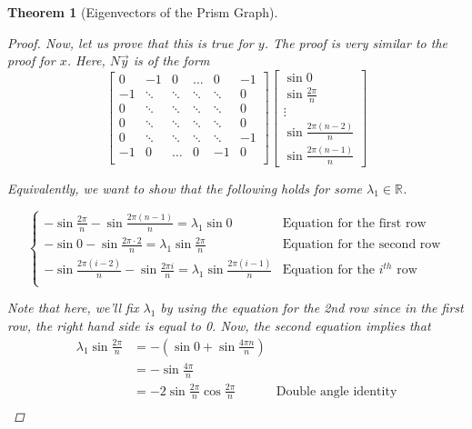 \documentclass[11pt]{report}
\newtheorem{theorem}{Theorem}[section]
\begin{document}
\begin{theorem}[Eigenvectors of the Prism Graph]
\begin{proof}
        Now, let us prove that this is true for $y$. The proof is very similar to the proof for $x$. Here, $N\vec{y}$ is of the form
        \[
        \begin{bmatrix}
        0  & -1     & 0      & \dots   & 0      & -1 \\
        -1 & \ddots & \ddots & \ddots  & \ddots & 0 \\
        0  & \ddots & \ddots & \ddots  & \ddots & 0 \\
        0  & \ddots & \ddots & \ddots  & \ddots & 0 \\
        0  & \ddots & \ddots & \ddots  & \ddots & -1 \\
        -1 & 0      & \dots  & 0       & -1     & 0 \\
        \end{bmatrix}
        \begin{bmatrix}
            \sin{0} \\ 
            \sin{\frac{2 \pi}{n}} \\
            \vdots \\
            \sin{\frac{2 \pi(n-2)}{n}} \\
            \sin{\frac{2 \pi(n-1)}{n}}
        \end{bmatrix}
        \]
        
        Equivalently, we want to show that the following holds for some $\lambda_1 \in \mathbb{R}$.
        
        \[\begin{cases}
        -\sin{\frac{2 \pi}{n}} - \sin{\frac{2\pi(n-1)}{n}} = \lambda_1 \sin{0} &\text{Equation for the first row} \\
        -\sin{0} - \sin{\frac{2\pi\cdot 2}{n}} = \lambda_1 \sin{\frac{2 \pi}{n}} &\text{Equation for the second row} \\
        -\sin{\frac{2 \pi (i - 2)}{n}} - \sin{\frac{2 \pi i}{n}} = \lambda_1 \sin{\frac{2\pi(i-1)}{n}}
        &\text{Equation for the $i^{th}$ row} \\
        \end{cases}\]
        
        Note that here, we'll fix $\lambda_1$ by using the equation for the 2nd row since in the first row, the right hand side is equal to 0. Now, the second equation implies that 
        \[\begin{aligned}
        \lambda_1 \sin{\frac{2\pi}{n}}
        &= -\left( \sin{0} + \sin{\frac{4\pi n}{n}} \right) \\
        &= -\sin{\frac{4\pi}{n}} \\
        &= -2\sin{\frac{2\pi}{n}}\cos{\frac{2\pi}{n}}
        &\text{Double angle identity} \\
        \end{aligned}\]
        

\end{proof}
\end{theorem}
\end{document}
